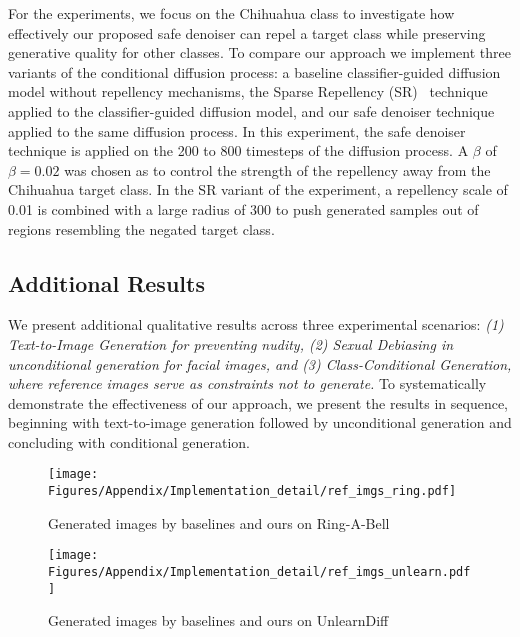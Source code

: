 For the experiments, we focus on the Chihuahua class to investigate how effectively our proposed safe denoiser can repel a target class while preserving generative quality for other classes. To compare our approach we implement three variants of the conditional diffusion process: a baseline classifier-guided diffusion model without repellency mechanisms, the Sparse Repellency (SR)~\cite{kirchhof2024sparse} technique applied to the classifier-guided diffusion model, and our safe denoiser technique applied to the same diffusion process. In this experiment, the safe denoiser technique is applied on the 200 to 800 timesteps of the diffusion process. A $\beta$ of $\beta=0.02$ was chosen as to control the strength of the repellency away from the Chihuahua target class. %
In the SR variant of the experiment, a repellency scale of 0.01 is combined with a large radius of 300 to push generated samples out of regions resembling the negated target class.

%


\subsection{Additional Results}
We present additional qualitative results across three experimental scenarios: \textit{(1) Text-to-Image Generation for preventing nudity, (2) Sexual Debiasing in unconditional generation for facial images, and (3) Class-Conditional Generation, where reference images serve as constraints not to generate.} To systematically demonstrate the effectiveness of our approach, we present the results in sequence, beginning with text-to-image generation followed by unconditional generation and concluding with conditional generation.

\begin{figure*}[!ht]
    \centering
    \texttt{[image: Figures/Appendix/Implementation\_detail/ref\_imgs\_ring.pdf]}
    \caption{Generated images by baselines and ours on Ring-A-Bell \cite{tsai2024ringabell}}
    \label{fig:ringabell}
\end{figure*}


\begin{figure*}[!ht]
    \centering
    \texttt{[image: Figures/Appendix/Implementation\_detail/ref\_imgs\_unlearn.pdf]}
    \caption{Generated images by baselines and ours on UnlearnDiff \cite{zhang2024generate}}
    \label{fig:unlearndiff}
\end{figure*}




